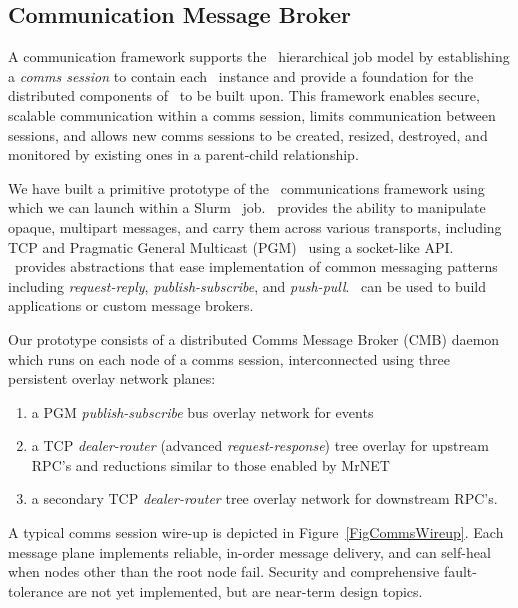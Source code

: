 \subsection{Communication Message Broker}

A communication framework supports the \flux\ hierarchical job model
by establishing a {\em comms session} to contain each \flux\ instance
and provide a foundation for the distributed components of \flux\ to
be built upon.
This framework enables secure, scalable communication
within a comms session, limits communication between sessions,
and allows new comms sessions to be created, resized, destroyed,
and monitored by existing ones in a parent-child relationship.

We have built a primitive prototype of the \flux\ communications framework
using \zMQ~\cite{ZMQGuide} which we can launch within a
Slurm~\cite{Jette02slurm} job.
\zMQ\ provides the ability to manipulate opaque,
multipart messages, and carry them across various transports, including
TCP and Pragmatic General Multicast (PGM)~\cite{rfc3208}
using a socket-like API.
\zMQ\ provides abstractions that ease implementation of common
messaging patterns including {\em request-reply}, {\em publish-subscribe},
and {\em push-pull}.
\zMQ\ can be used to build applications or custom message brokers.

Our prototype consists of a distributed Comms Message Broker (CMB)
daemon which runs on each node of a comms session, interconnected using
three persistent overlay network planes:
\begin{enumerate}
\item{a PGM {\em publish-subscribe} bus overlay network for events}
\item{a TCP {\em dealer-router} (advanced {\em request-response})
tree overlay for upstream RPC's and reductions
similar to those enabled by MrNET~\cite{mrnet}}
\item{a secondary TCP {\em dealer-router} tree overlay network for
downstream RPC's.}
\end{enumerate}
A typical comms session wire-up is depicted in Figure~\ref{FigCommsWireup}.
Each message plane implements reliable, in-order message delivery, and
can self-heal when nodes other than the root node fail.
Security and comprehensive fault-tolerance are not yet implemented,
but are near-term design topics.

